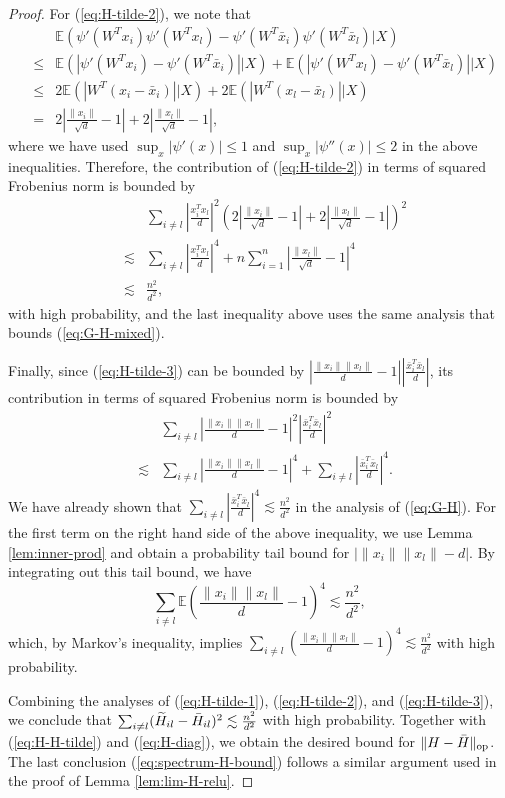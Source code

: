\begin{proof}
For (\ref{eq:H-tilde-2}), we note that
\begin{eqnarray*}
&& \mathbb{E}\left(\psi'(W^T{x}_i)\psi'(W^T{x}_l)-\psi'(W^T\bar{x}_i)\psi'(W^T\bar{x}_l)\big|X\right) \\
&\leq& \mathbb{E}\left(|\psi'(W^T{x}_i)-\psi'(W^T\bar{x}_i)|\big|X\right) + \mathbb{E}\left(|\psi'(W^T{x}_l)-\psi'(W^T\bar{x}_l)|\big|X\right) \\
&\leq& 2\mathbb{E}\left(|W^T(x_i-\bar{x}_i)|\big|X\right) + 2\mathbb{E}\left(|W^T(x_l-\bar{x}_l)|\big|X\right) \\
&=& 2\left|\frac{\|x_i\|}{\sqrt{d}}-1\right| + 2\left|\frac{\|x_l\|}{\sqrt{d}}-1\right|,
\end{eqnarray*}
where we have used $\sup_x|\psi'(x)|\leq 1$ and $\sup_x|\psi''(x)|\leq 2$ in the above inequalities. Therefore, the contribution of (\ref{eq:H-tilde-2}) in terms of squared Frobenius norm is bounded by
\begin{eqnarray*}
&& \sum_{i\neq l}\left|\frac{x_i^Tx_l}{d}\right|^2\left(2\left|\frac{\|x_i\|}{\sqrt{d}}-1\right| + 2\left|\frac{\|x_l\|}{\sqrt{d}}-1\right|\right)^2 \\
&\lesssim& \sum_{i\neq l}\left|\frac{x_i^Tx_l}{d}\right|^4 + n\sum_{i=1}^n\left|\frac{\|x_l\|}{\sqrt{d}}-1\right|^4 \\
&\lesssim& \frac{n^2}{d^2},
\end{eqnarray*}
with high probability, and the last inequality above uses the same analysis that bounds (\ref{eq:G-H-mixed}).

Finally, since (\ref{eq:H-tilde-3}) can be bounded by $\left|\frac{\|x_i\|\|x_l\|}{d}-1\right|\left|\frac{\bar{x}_i^T\bar{x}_l}{d}\right|$, its contribution in terms of squared Frobenius norm is bounded by
\begin{eqnarray*}
&& \sum_{i\neq l}\left|\frac{\|x_i\|\|x_l\|}{d}-1\right|^2\left|\frac{\bar{x}_i^T\bar{x}_l}{d}\right|^2 \\
&\lesssim& \sum_{i\neq l}\left|\frac{\|x_i\|\|x_l\|}{d}-1\right|^4 + \sum_{i\neq l}\left|\frac{\bar{x}_i^T\bar{x}_l}{d}\right|^4.
\end{eqnarray*}
We have already shown that $\sum_{i\neq l}\left|\frac{\bar{x}_i^T\bar{x}_l}{d}\right|^4\lesssim \frac{n^2}{d^2}$ in the analysis of (\ref{eq:G-H}). For the first term on the right hand side of the above inequality, we use Lemma \ref{lem:inner-prod} and obtain a probability tail bound for $|\|x_i\|\|x_l\|-d|$. By integrating out this tail bound, we have
$$\sum_{i\neq l}\mathbb{E}\left(\frac{\|x_i\|\|x_l\|}{d}-1\right)^4\lesssim \frac{n^2}{d^2},$$
which, by Markov's inequality, implies $\sum_{i\neq l}\left(\frac{\|x_i\|\|x_l\|}{d}-1\right)^4\lesssim \frac{n^2}{d^2}$ with high probability.

Combining the analyses of (\ref{eq:H-tilde-1}), (\ref{eq:H-tilde-2}), and (\ref{eq:H-tilde-3}), we conclude that $\sum_{i\neq l}(\widetilde{H}_{il}-\bar{H}_{il})^2\lesssim \frac{n^2}{d^2}$ with high probability. Together with (\ref{eq:H-H-tilde}) and (\ref{eq:H-diag}), we obtain the desired bound for $\|H-\bar{H}\|_{\rm op}$.
The last conclusion (\ref{eq:spectrum-H-bound}) follows a similar argument used in the proof of Lemma \ref{lem:lim-H-relu}.
\end{proof}


